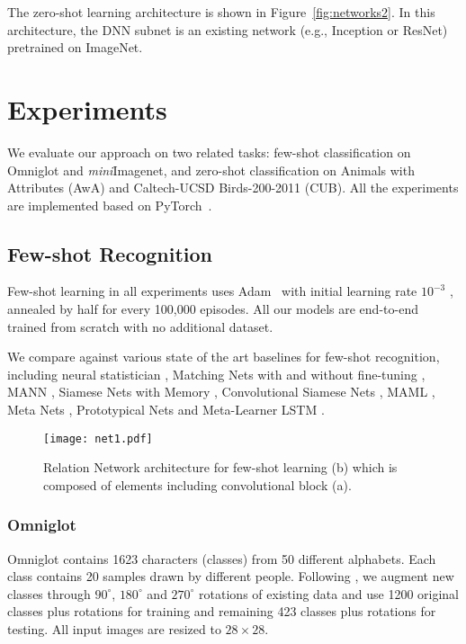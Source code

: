 \documentclass[10pt,twocolumn,letterpaper]{article}
\begin{document}
The zero-shot learning architecture is shown in Figure~\ref{fig:networks2}. In this architecture, the DNN subnet is an existing network (e.g., Inception or ResNet) pretrained on ImageNet.





\section{Experiments}
We evaluate our approach on two related tasks: few-shot classification on Omniglot and \textit{mini}Imagenet, and zero-shot classification on Animals with Attributes (AwA) and Caltech-UCSD Birds-200-2011 (CUB). All the experiments are implemented based on PyTorch~\cite{PyTorch}.





\subsection{Few-shot Recognition}
\label{sec:exp-few-shot}

Few-shot learning in all experiments  uses  Adam~\cite{kingma2014adam} with initial learning rate $10^{-3}$ , annealed by half for every 100,000 episodes. 
All our models are end-to-end trained from scratch with no additional dataset.

We compare against various state of the art baselines for few-shot recognition, including  neural statistician \cite{edwards2016towards},
Matching Nets with and without fine-tuning \cite{vinyals2016matching},
MANN \cite{santoro2016meta},
Siamese Nets with Memory \cite{kaiser2017learning},
Convolutional Siamese Nets \cite{koch2015siamese},
MAML \cite{finn2017model},
Meta Nets \cite{munkhdalai2017meta},
Prototypical Nets \cite{snell2017prototypical} and
Meta-Learner LSTM \cite{ravi2016optimization}.

\begin{figure}[t]
\begin{center}
\texttt{[image: net1.pdf]}
\end{center}
   \caption{\small Relation Network architecture for few-shot learning (b) which is composed of elements including convolutional block (a).}
\label{fig:networks}
\vspace{-1em}
\end{figure}

\subsubsection{Omniglot}
Omniglot \cite{lake2011one} contains 1623 characters (classes) from 50 different alphabets. Each class contains 20 samples drawn by different people.
Following \cite{santoro2016meta, vinyals2016matching, snell2017prototypical}, we augment new classes through $90^{\circ}$, $180^{\circ}$ and $270^{\circ}$ rotations of existing data and use 1200 original classes plus rotations for training and remaining 423 classes plus rotations for testing. All input images are resized to $28 \times 28$. 
\end{document}

